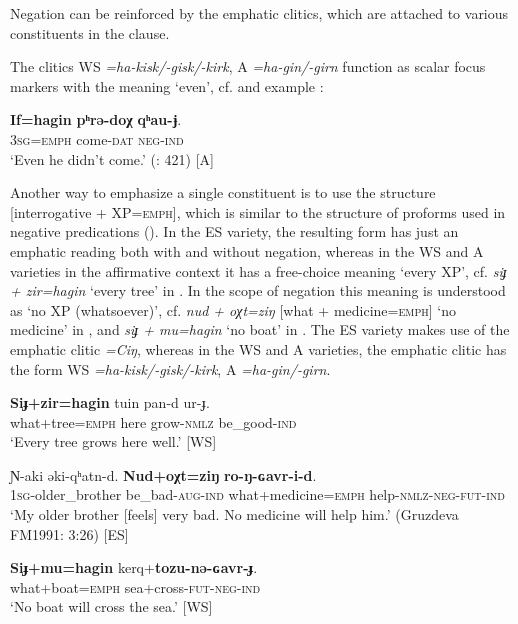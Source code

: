 \documentclass[output=paper,colorlinks,citecolor=brown]{langscibook}
\begin{document}
Negation can be reinforced by the emphatic clitics, which are attached to various constituents in the clause.

The clitics WS \textit{=ha-kisk/-gisk/-kirk}, A \textit{=ha-gin/-girn} function as scalar focus markers with the meaning ‘even’, cf. \citet[158]{Haspelmath1997} and example :

\ea\label{ex:niv:140}
    \gll \textbf{If=hagin} \textbf{pʰrǝ-doχ} \textbf{qʰau-ɉ}. \\ 
         \textsc{3sg}=\textsc{emph} come-\textsc{dat} \textsc{neg-ind} \\
    \glt ‘Even he didn’t come.’ (\citealt{SaveljevaTaksami1970}: 421) [A]
\z 

Another way to emphasize a single constituent is to use the structure [interrogative + XP=\textsc{emph}], which is similar to the structure of proforms used in negative predications (). In the ES variety, the resulting form has just an emphatic reading both with and without negation, whereas in the WS and A varieties in the affirmative context it has a free-choice meaning ‘every XP’, cf. \textit{siɟ + zir=hagin} ‘every tree’ in . In the scope of negation this meaning is understood as ‘no XP (whatsoever)’, cf. \textit{nud + oχt=ziŋ} [what + medicine=\textsc{emph}] ‘no medicine’ in , and \textit{siɟ + mu=hagin} ‘no boat’ in . The ES variety makes use of the emphatic clitic \textit{=Ciŋ}, whereas in the WS and A varieties, the emphatic clitic has the form WS \textit{=ha-kisk/-gisk/-kirk}, A \textit{=ha-gin/-girn}.

\ea\label{ex:niv:141}
    \gll \textbf{Siɟ+zir=hagin} tuin pan-d ur-ɟ. \\ 
         what+tree=\textsc{emph} here grow-\textsc{nmlz} be\_good-\textsc{ind} \\
    \glt ‘Every tree grows here well.’ \citep[165]{Panfilov1965} [WS]
\z 

\ea\label{ex:niv:142}
    \gll Ɲ-aki əki-qʰatn-d. \textbf{Nud+oχt=ziŋ} \textbf{ro-ŋ-ɢavr-i-d}.\\ 
         \textsc{1sg}{}-older\_brother be\_bad-\textsc{aug-ind} what+medicine=\textsc{emph} help-\textsc{nmlz}{}-\textsc{neg-fut-ind} \\
    \glt ‘My older brother [feels] very bad. No medicine will help him.’ (Gruzdeva FM1991: 3:26) [ES]
\z 

\ea\label{ex:niv:143}
    \gll \textbf{Siɟ+mu=hagin} kerq+\textbf{tozu-nə-ɢavr-ɟ}. \\ 
         what+boat=\textsc{emph} sea+cross-\textsc{fut-neg-ind} \\
    \glt ‘No boat will cross the sea.’ \citep[165]{Panfilov1965} [WS]
\z 
\end{document}
